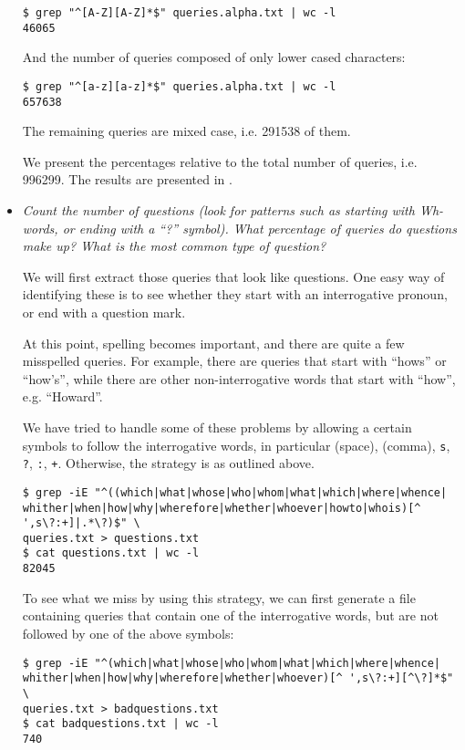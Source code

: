 \begin{itemize}
\begin{lstlisting}
$ grep "^[A-Z][A-Z]*$" queries.alpha.txt | wc -l
46065
\end{lstlisting}

And the number of queries composed of only lower cased characters:

\begin{lstlisting}
$ grep "^[a-z][a-z]*$" queries.alpha.txt | wc -l
657638
\end{lstlisting}

The remaining queries are mixed case, i.e. 291538 of them.

We present the percentages relative to the total number of queries, i.e.
996299. The results are presented in .

\item \emph{Count the number of questions (look for patterns such as starting
with Wh-words, or ending with a ``?''    symbol). What percentage of queries do
questions make up? What is the most common type of question?}

We will first extract those queries that look like questions. One easy way of
identifying these is to see whether they start with an interrogative pronoun,
or end with a question mark.

At this point, spelling becomes important, and there are quite a few misspelled
queries. For example, there are queries that start with ``hows'' or ``how's'',
while there are other non-interrogative words that start with ``how'', e.g.
``Howard''.

We have tried to handle some of these problems by allowing a certain symbols to
follow the interrogative words, in particular (space), (comma), \texttt{s},
\texttt{?}, \texttt{:}, \texttt{+}. Otherwise, the strategy is as outlined
above.

\begin{lstlisting}
$ grep -iE "^((which|what|whose|who|whom|what|which|where|whence|
whither|when|how|why|wherefore|whether|whoever|howto|whois)[^ ',s\?:+]|.*\?)$" \
queries.txt > questions.txt
$ cat questions.txt | wc -l
82045
\end{lstlisting}

To see what we miss by using this strategy, we can first generate a file
containing queries that contain one of the interrogative words, but are not
followed by one of the above symbols:

\begin{lstlisting}
$ grep -iE "^(which|what|whose|who|whom|what|which|where|whence|
whither|when|how|why|wherefore|whether|whoever)[^ ',s\?:+][^\?]*$" \
queries.txt > badquestions.txt
$ cat badquestions.txt | wc -l
740
\end{lstlisting}


\end{itemize}
